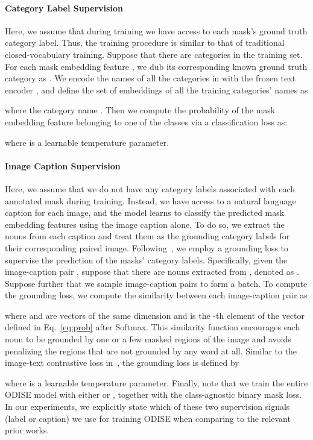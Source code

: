 \documentclass[10pt,twocolumn,letterpaper]{article}
\newcommand{\ourmethod}{ODISE}
\begin{document}
\paragraph{Category Label Supervision}
Here, we assume that during training we have access to each mask's ground truth category label. Thus, the training procedure is similar to that of traditional closed-vocabulary training. 
Suppose that there are  categories in the training set. For each mask embedding feature , we dub its corresponding known ground truth category as .
We encode the names of all the categories in  with the frozen text encoder ,
and define the set of embeddings of all the training categories' names as
 
where the category name . 
Then we compute the probability of the mask embedding feature  belonging to one of the  classes via a classification loss as:

where  is a learnable temperature parameter. 

\paragraph{Image Caption Supervision}
Here, we assume that we do not have any category labels associated with each annotated mask during training. 
Instead, we have access to a natural language caption for each image, and the model learns to classify the predicted mask embedding features using the image caption alone. 
To do so, we extract the nouns from each caption and treat them as the grounding category labels for their corresponding paired image. Following~\cite{gupta2020contrastive, zareian2021open, ghiasi2021open}, we employ a grounding loss to supervise the prediction of the masks' category labels. 
Specifically, given the image-caption pair , suppose that there are  nouns extracted from , denoted as . 
Suppose further that we sample  image-caption pairs  to form a batch. To compute the grounding loss, we compute the similarity between each image-caption pair as 
 
where  and  are vectors of the same dimension and  is the -th element of the vector defined in Eq.~\ref{eq:prob} after Softmax.
This similarity function encourages each noun to be grounded by one or a few masked regions of the image and avoids penalizing the regions that are not grounded by any word at all.
Similar to the image-text contrastive loss in~\cite{radford2021clip, jia2021align}, the grounding loss is defined by

where  is a learnable temperature parameter.
Finally, note that we train the entire \ourmethod{} model with either  or , 
together with the class-agnostic binary mask loss. In our experiments, we explicitly state which of these two supervision signals (label or caption) we use for training \ourmethod{} when comparing to the relevant prior works.
\end{document}
